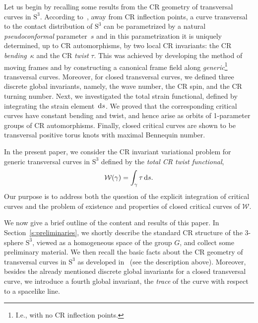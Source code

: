 \documentclass[10pt,a4paper]{amsart}
\numberwithin{equation}{section}
\begin{document}
Let us begin by recalling some results from the CR geometry
of transversal curves in $\mathrm{S}^3$.
According to~\cite{MNS-Kharkiv}, away from CR inflection points,
a curve transversal to the contact distribution of $\mathrm{S}^3$
can be parametrized by a natural \textit{pseudoconformal} parameter~$s$ and in this parametrization it is
uniquely determined, up to CR automorphisms,
by two local CR invariants: the CR \textit{bending}~$\kappa$ and the CR \textit{twist} $\tau$.
This was achieved by developing the method of moving frames and by constructing a canonical
frame field along \textit{generic}\footnote{I.e., with no CR inflection points.} transversal curves.
Moreover, for closed transversal curves, we defined three discrete global invariants, namely,
the wave number, the CR spin, and the CR turning number.
Next, we investigated the total strain functional, defined
by integrating the strain element~${\rm d}s$.
%
We proved that the corresponding critical curves have
constant bending and twist, and hence
arise as orbits of 1-parameter groups of CR automorphisms. Finally,
closed critical curves
are shown to be transversal positive torus knots with maximal Bennequin number.

In the present paper, we consider
the CR invariant variational problem for generic transversal curves in $\mathrm{S}^3$ defined by the
\textit{total CR twist functional},
\[
\mathcal{W}(\gamma) = \int_\gamma \tau \,{\rm d}s.
\]
Our purpose is to address both the question of the explicit integration of critical curves and
the problem of existence and properties of closed critical curves of $\mathcal{W}$.


We now give a brief outline of the content and results of this paper.
In Section~\ref{s:preliminaries}, we shortly describe the standard CR
structure of the 3-sphere $\mathrm{S}^3$,
viewed as a homogeneous space of the
group $G$, and collect some preliminary material. We then recall the basic facts
about the CR geometry of transversal curves in $\mathrm{S}^3$ as
developed in~\cite{MNS-Kharkiv} (see the description above).
%
Moreover, besides the already mentioned discrete global invariants for a closed transversal curve,
we introduce a fourth global invariant, the \textit{trace} of the curve with respect to a spacelike line.
\end{document}
